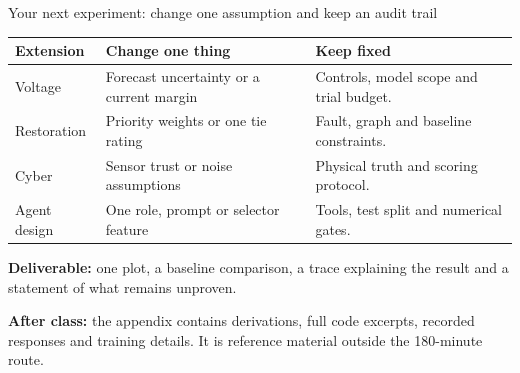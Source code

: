\begin{frame}[t]{Your next experiment: change one assumption and keep an audit trail}

\begin{tabular}{@{}>{\raggedright\arraybackslash}p{.20\linewidth}>{\raggedright\arraybackslash}p{.43\linewidth}>{\raggedright\arraybackslash}p{.29\linewidth}@{}}
\toprule Extension & Change one thing & Keep fixed \\
\midrule
Voltage & Forecast uncertainty or a current margin & Controls, model scope and trial budget. \\
Restoration & Priority weights or one tie rating & Fault, graph and baseline constraints. \\
Cyber & Sensor trust or noise assumptions & Physical truth and scoring protocol. \\
Agent design & One role, prompt or selector feature & Tools, test split and numerical gates. \\
\bottomrule
\end{tabular}\par
\par\medskip
\textbf{Deliverable:} one plot, a baseline comparison, a trace explaining the result and a statement of what remains unproven.
\par\medskip
\textbf{After class:} the appendix contains derivations, full code excerpts, recorded responses and training details. It is reference material outside the 180-minute route.

\end{frame}

